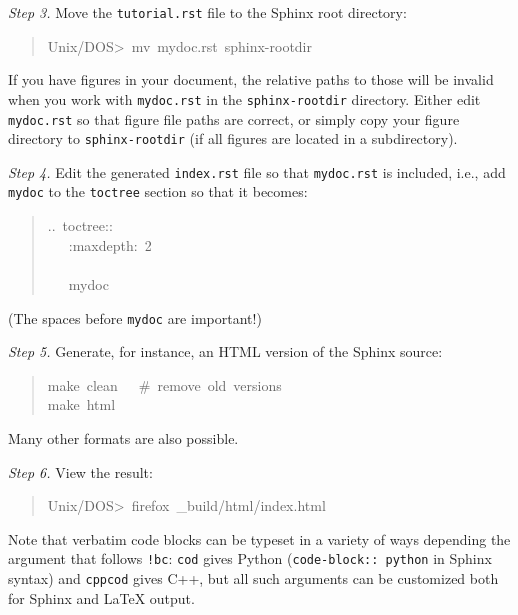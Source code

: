 \documentclass[a4paper,english]{article}
\begin{document}
\emph{Step 3.} Move the \texttt{tutorial.rst} file to the Sphinx root directory:
%
\begin{quote}{\ttfamily \raggedright \noindent
Unix/DOS>~mv~mydoc.rst~sphinx-rootdir
}
\end{quote}

If you have figures in your document, the relative paths to those will
be invalid when you work with \texttt{mydoc.rst} in the \texttt{sphinx-rootdir}
directory. Either edit \texttt{mydoc.rst} so that figure file paths are correct,
or simply copy your figure directory to \texttt{sphinx-rootdir} (if all figures
are located in a subdirectory).

\emph{Step 4.} Edit the generated \texttt{index.rst} file so that \texttt{mydoc.rst}
is included, i.e., add \texttt{mydoc} to the \texttt{toctree} section so that it becomes:
%
\begin{quote}{\ttfamily \raggedright \noindent
..~toctree::\\
~~~:maxdepth:~2\\
~\\
~~~mydoc
}
\end{quote}

(The spaces before \texttt{mydoc} are important!)

\emph{Step 5.} Generate, for instance, an HTML version of the Sphinx source:
%
\begin{quote}{\ttfamily \raggedright \noindent
make~clean~~~\#~remove~old~versions\\
make~html
}
\end{quote}

Many other formats are also possible.

\emph{Step 6.} View the result:
%
\begin{quote}{\ttfamily \raggedright \noindent
Unix/DOS>~firefox~\_build/html/index.html
}
\end{quote}

Note that verbatim code blocks can be typeset in a variety of ways
depending the argument that follows \texttt{!bc}: \texttt{cod} gives Python
(\texttt{code-block:: python} in Sphinx syntax) and \texttt{cppcod} gives C++, but
all such arguments can be customized both for Sphinx and LaTeX output.



\end{document}
